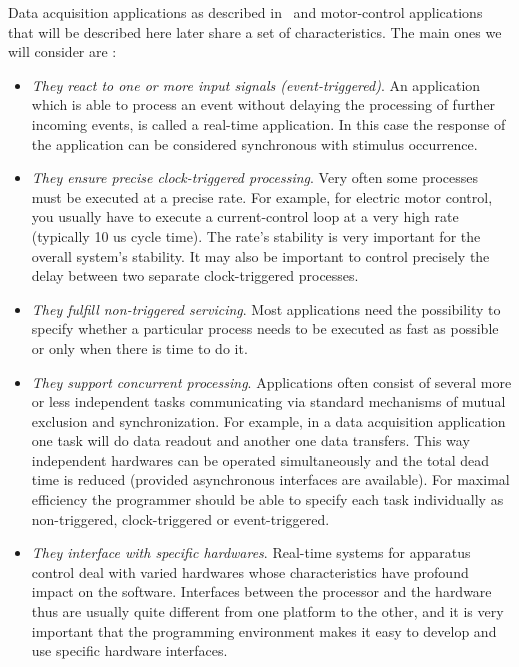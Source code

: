 \documentclass[10pt]{report}
\begin{document}
Data acquisition applications as described in~\cite{Delchini:95} and 
motor-control applications that will be described here later 
share a set of characteristics. The main ones we will consider 
are :

\begin{itemize}

\item {\em They react to one or more input signals (event-triggered)}. An 
  application which is able to process an event without delaying 
  the processing of further incoming events, is called a 
  real-time application. In this case the response of the 
  application can be considered synchronous with stimulus 
  occurrence.

\item {\em They ensure precise clock-triggered processing}. Very often 
  some processes must be executed at a precise rate. For example, 
  for electric motor control, you usually have to execute a 
  current-control loop at a very high rate (typically 10 us cycle 
  time). The rate's stability is very important for the overall 
  system's stability. It may also be important to control 
  precisely the delay between two separate clock-triggered 
  processes.

\item {\em They fulfill non-triggered servicing}. Most applications need 
  the possibility to specify whether a particular process needs 
  to be executed as fast as possible or only when 
  there is time to do it.

\item {\em They support concurrent processing}. Applications often consist 
  of several more or less independent tasks communicating via 
  standard mechanisms of mutual exclusion and synchronization. 
  For example, in a data acquisition application one task will do 
  data readout and another one data transfers. This way 
  independent hardwares can be operated simultaneously and the 
  total dead time is reduced (provided asynchronous interfaces 
  are available). For maximal efficiency the programmer should be 
  able to specify each task individually as non-triggered, 
  clock-triggered or event-triggered.

\item {\em They interface with specific hardwares}. Real-time systems for 
  apparatus control deal with varied hardwares whose 
  characteristics have profound impact on the software. 
  Interfaces between the processor and the hardware thus are 
  usually quite different from one platform to the other, and it 
  is very important that the programming environment makes it 
  easy to develop and use specific hardware interfaces.

\end{itemize}
\end{document}
